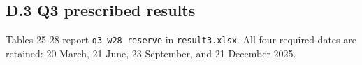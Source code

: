 \endgroup

\subsection*{D.3 Q3 prescribed results}\label{d.3-q3-prescribed-results}

Tables 25-28 report \nolinkurl{q3_w28_reserve} in \nolinkurl{result3.xlsx}. All four required dates are retained: 20 March, 21 June, 23 September, and 21 December 2025.

\Needspace{97.9pt}
\begingroup
\fontsize{8.3}{9.96}\selectfont
\setlength{\tabcolsep}{3.2pt}
\renewcommand{\arraystretch}{1.12}
\setlength{\LTleft}{0pt plus 1fill}\setlength{\LTright}{0pt plus 1fill}
\setlength{\LTcapwidth}{\linewidth}

